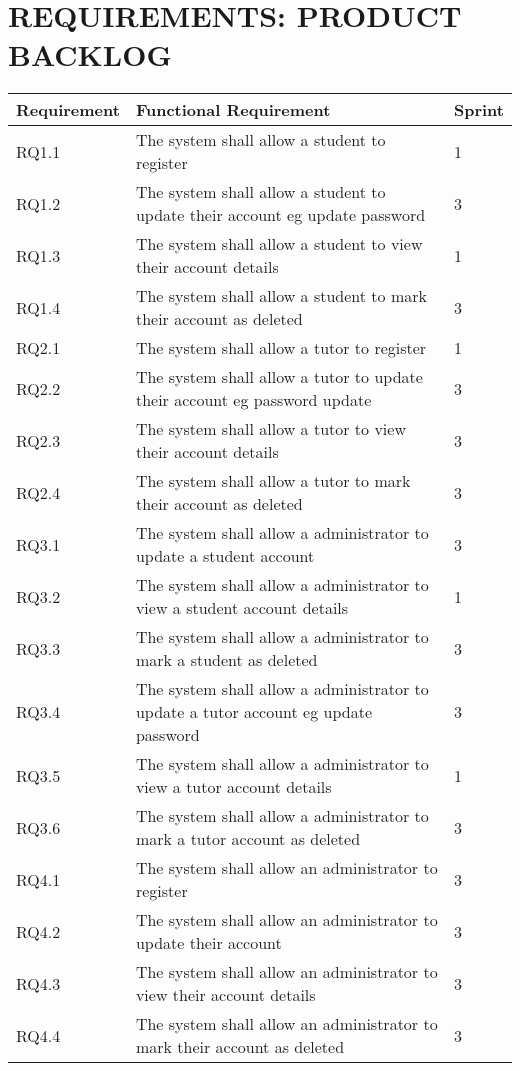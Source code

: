 \documentclass[12pt]{article}
\begin{document}
\section{REQUIREMENTS: PRODUCT BACKLOG}
{
\centering
\begin{longtable}{| l | p{10cm}| l |}
			\hline			
			\textbf{Requirement} & \textbf{Functional Requirement} & \textbf{Sprint}
			
			\\ \hline RQ1.1 & The system shall allow a student to register  & 1\\ \hline 
			RQ1.2 & The system shall allow a student to update their account eg update password & 3\\ \hline  
			RQ1.3 & The system shall allow a student to view their account details  & 1\\ \hline 
			RQ1.4 & The system shall allow a student to mark their account as deleted & 3\\ \hline 
			
			
			RQ2.1 & The system shall allow a tutor to register & 1\\ \hline
			RQ2.2 & The system shall allow a tutor to update their account eg password update & 3 \\ \hline
			RQ2.3 & The system shall allow a tutor to view their account details & 3\\ \hline
			RQ2.4 & The system shall allow a tutor to mark their account as deleted & 3\\ \hline  
						
			RQ3.1 & The system shall allow a administrator to update a student account & 3\\ \hline  
			RQ3.2 & The system shall allow a administrator to view a student account details   & 1\\ \hline 
			RQ3.3 & The system shall allow a administrator to mark a student as deleted & 3\\ \hline 
			RQ3.4 & The system shall allow a administrator to update a tutor account eg update password  & 3\\ \hline
			RQ3.5 & The system shall allow a administrator to view a tutor account details & 1\\ \hline
			RQ3.6 & The system shall allow a administrator to mark a tutor account as deleted &  3\\ \hline
				
			
			RQ4.1 & The system shall allow an administrator to register  & 3\\ \hline 
			RQ4.2 & The system shall allow an administrator to update their account & 3\\ \hline  
			RQ4.3 & The system shall allow an administrator to view their account details  & 3\\ \hline 
			RQ4.4 & The system shall allow an administrator to mark their account as deleted & 3\\ \hline 


\end{longtable}}
\end{document}
